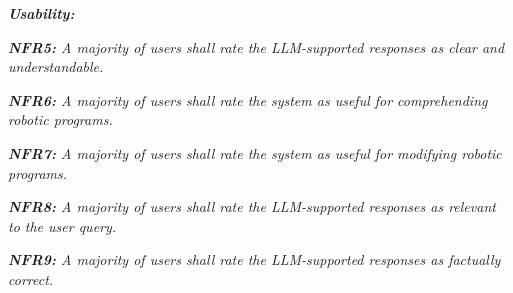 \begin{adjustwidth}{\indentWidthTwenty}{\indentWidthTwenty}
    \textit{\textbf{Usability:}}
\end{adjustwidth}
\begin{adjustwidth}{\indentWidthForty}{\indentWidthForty}
    \textit{\textbf{NFR5:} A majority of users shall rate the LLM-supported responses as clear and understandable.}
\end{adjustwidth}
\begin{adjustwidth}{\indentWidthForty}{\indentWidthForty}
    \textit{\textbf{NFR6:} A majority of users shall rate the system as useful for comprehending robotic programs.}
\end{adjustwidth}
\begin{adjustwidth}{\indentWidthForty}{\indentWidthForty}
    \textit{\textbf{NFR7:} A majority of users shall rate the system as useful for modifying robotic programs.}
\end{adjustwidth}
\begin{adjustwidth}{\indentWidthForty}{\indentWidthForty}
    \textit{\textbf{NFR8:} A majority of users shall rate the LLM-supported responses as relevant to the user query.}
\end{adjustwidth}
\begin{adjustwidth}{\indentWidthForty}{\indentWidthForty}
    \textit{\textbf{NFR9:} A majority of users shall rate the LLM-supported responses as factually correct.}
\end{adjustwidth}